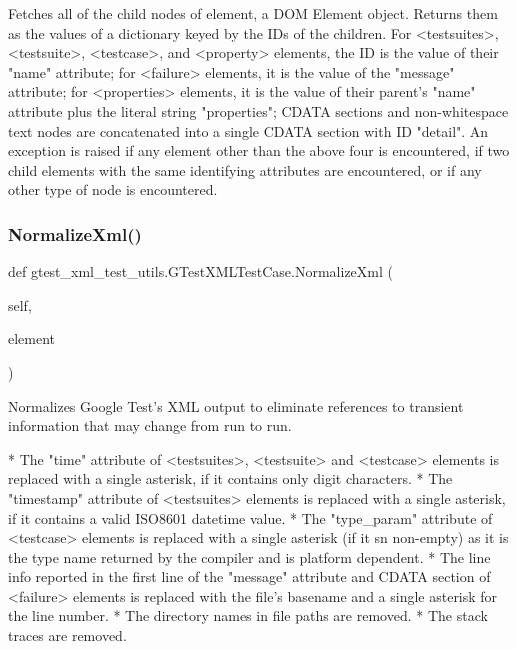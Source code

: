 \begin{DoxyVerb}Fetches all of the child nodes of element, a DOM Element object.
Returns them as the values of a dictionary keyed by the IDs of the
children.  For <testsuites>, <testsuite>, <testcase>, and <property>
elements, the ID is the value of their "name" attribute; for <failure>
elements, it is the value of the "message" attribute; for <properties>
elements, it is the value of their parent's "name" attribute plus the
literal string "properties"; CDATA sections and non-whitespace
text nodes are concatenated into a single CDATA section with ID
"detail".  An exception is raised if any element other than the above
four is encountered, if two child elements with the same identifying
attributes are encountered, or if any other type of node is encountered.
\end{DoxyVerb}
 \mbox{\label{classgtest__xml__test__utils_1_1_g_test_x_m_l_test_case_ac4823e96c3b5327b25a340a3605447d9}} 
\subsubsection{\texorpdfstring{Normalize\+Xml()}{NormalizeXml()}}
{\footnotesize\ttfamily def gtest\+\_\+xml\+\_\+test\+\_\+utils.\+G\+Test\+X\+M\+L\+Test\+Case.\+Normalize\+Xml (\begin{DoxyParamCaption}\item[{}]{self,  }\item[{}]{element }\end{DoxyParamCaption})}

\begin{DoxyVerb}Normalizes Google Test's XML output to eliminate references to transient
information that may change from run to run.

*  The "time" attribute of <testsuites>, <testsuite> and <testcase>
   elements is replaced with a single asterisk, if it contains
   only digit characters.
*  The "timestamp" attribute of <testsuites> elements is replaced with a
   single asterisk, if it contains a valid ISO8601 datetime value.
*  The "type_param" attribute of <testcase> elements is replaced with a
   single asterisk (if it sn non-empty) as it is the type name returned
   by the compiler and is platform dependent.
*  The line info reported in the first line of the "message"
   attribute and CDATA section of <failure> elements is replaced with the
   file's basename and a single asterisk for the line number.
*  The directory names in file paths are removed.
*  The stack traces are removed.
\end{DoxyVerb}
 

